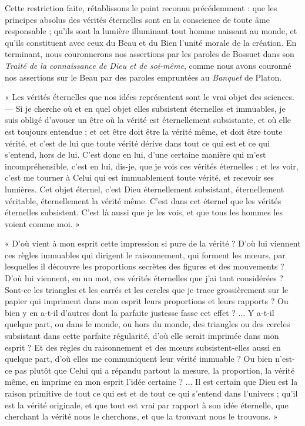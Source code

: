 \documentclass[a4paper, 11pt, oneside]{article}
\begin{document}
Cette restriction faite, rétablissons le point reconnu précédemment : que les principes absolus des vérités éternelles sont en la conscience de toute âme responsable ; qu'ils sont la lumière illuminant tout homme naissant au monde, et qu'ils constituent avec ceux du Beau et du Bien l'unité morale de la création. En terminant, nous couronnerons nos assertions par les paroles de Bossuet dans son \emph{Traité de la connaissance de Dieu et de soi-même}, comme nous avons couronné nos assertions sur le Beau par des paroles empruntées au \emph{Banquet} de Platon.

« Les vérités éternelles que nos idées représentent sont le vrai objet des sciences. --- Si je cherche où et en quel objet elles subsistent éternelles et immuables, je suis obligé d'avouer un être où la vérité est éternellement subsistante, et où elle est toujours entendue ; et cet être doit être la vérité même, et doit être toute vérité, et c'est de lui que toute vérité dérive dans tout ce qui est et ce qui s'entend, hors de lui. C'est donc en lui, d'une certaine manière qui m'est incompréhensible, c'est en lui, dis-je, que je vois ces vérités éternelles ; et les voir, c'est me tourner à Celui qui est immuablement toute vérité, et recevoir ses lumières. Cet objet éternel, c'est Dieu éternellement subsistant, éternellement véritable, éternellement la vérité même. C'est dans cet éternel que les vérités éternelles subsistent. C'est là aussi que je les vois, et que tous les hommes les voient comme moi. »

« D'où vient à mon esprit cette impression si pure de la vérité ? D'où lui viennent ces règles immuables qui dirigent le raisonnement, qui forment les mœurs, par lesquelles il découvre les proportions secrètes des figures et des mouvements ? D'où lui viennent, en un mot, ces vérités éternelles que j'ai tant considérées ? Sont-ce les triangles et les carrés et les cercles que je trace grossièrement sur le papier qui impriment dans mon esprit leurs proportions et leurs rapports ? Ou bien y en a-t-il d'autres dont la parfaite justesse fasse cet effet ? ... Y a-t-il quelque part, ou dans le monde, ou hors du monde, des triangles ou des cercles subsistant dans cette parfaite régularité, d'où elle serait imprimée dans mon esprit ? Et des règles du raisonnement et des mœurs subsistent-elles aussi en quelque part, d'où elles me communiquent leur vérité immuable ? Ou bien n'est-ce pas plutôt que Celui qui a répandu partout la mesure, la proportion, la vérité même, en imprime en mon esprit l'idée certaine ? ... Il est certain que Dieu est la raison primitive de tout ce qui est et de tout ce qui s'entend dans l'univers ; qu'il est la vérité originale, et que tout est vrai par rapport à son idée éternelle, que cherchant la vérité nous le cherchons, et que la trouvant nous le trouvons. »
\end{document}
